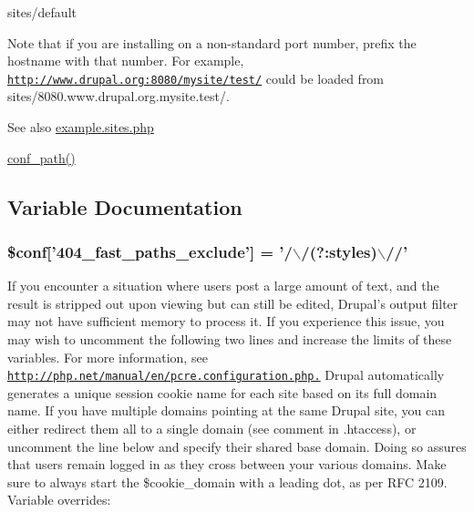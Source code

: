 \begin{DoxyItemize}
\item sites/default
\end{DoxyItemize}

Note that if you are installing on a non-\/standard port number, prefix the hostname with that number. For example, \href{http://www.drupal.org:8080/mysite/test/}{\tt http://www.drupal.org:8080/mysite/test/} could be loaded from sites/8080.www.drupal.org.mysite.test/.

\begin{DoxySeeAlso}{See also}
\hyperlink{example_8sites_8php}{example.sites.php} 

\hyperlink{bootstrap_8inc_acef612ef19c49f6259531f0bee5c26cc}{conf\_\-path()} 
\end{DoxySeeAlso}


\subsection{Variable Documentation}
\hypertarget{default_8settings_8php_ad6ddcdefc93f69592fa04339ffd242c4}{
\subsubsection[{\$conf}]{\setlength{\rightskip}{0pt plus 5cm}\$conf\mbox{[}'404\_\-fast\_\-paths\_\-exclude'\mbox{]} = '/$\backslash$/(?:styles)$\backslash$//'}}
\label{default_8settings_8php_ad6ddcdefc93f69592fa04339ffd242c4}
If you encounter a situation where users post a large amount of text, and the result is stripped out upon viewing but can still be edited, Drupal's output filter may not have sufficient memory to process it. If you experience this issue, you may wish to uncomment the following two lines and increase the limits of these variables. For more information, see \href{http://php.net/manual/en/pcre.configuration.php.}{\tt http://php.net/manual/en/pcre.configuration.php.} Drupal automatically generates a unique session cookie name for each site based on its full domain name. If you have multiple domains pointing at the same Drupal site, you can either redirect them all to a single domain (see comment in .htaccess), or uncomment the line below and specify their shared base domain. Doing so assures that users remain logged in as they cross between your various domains. Make sure to always start the \$cookie\_\-domain with a leading dot, as per RFC 2109. Variable overrides:

